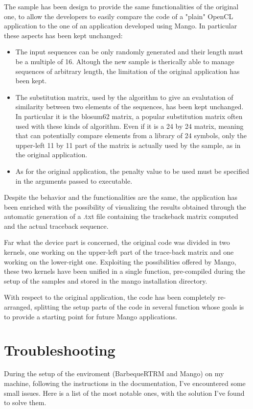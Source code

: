 The sample has been design to provide the same functionalities of the original one, to allow the developers to easily compare the code of a "plain" OpenCL application to the one of an application developed using Mango. In particular these aspects has been kept unchanged:
\begin{itemize}
      \item The input sequences can be only randomly generated and their length must be a multiple of 16. Altough the new sample is therically able to manage sequences of arbitrary length, the limitation of the original application has been kept.
      \item The substitution matrix, used by the algorithm to give an evalutation of similarity between two elements of the sequences, has been kept unchanged. In particular it is the blosum62 matrix, a popular substitution matrix often used with these kinds of algorithm. Even if it is a 24 by 24 matrix, meaning that can potentially compare elements from a library of 24 symbols, only the upper-left 11 by 11 part of the matrix is actually used by the sample, as in the original application.
      \item As for the original application, the penalty value to be used must be specified in the arguments passed to executable.
\end{itemize}
Despite the behavior and the functionalities are the same, the application has been enriched with the possibility of visualizing the results obtained through the automatic generation of a .txt file containing the trackeback matrix computed and the actual traceback sequence.

Far what the device part is concerned, the original code was divided in two kernels, one working on the upper-left part of the trace-back matrix and one working on the lower-right one. Exploiting the possibilities offered by Mango, these two kernels have been unified in a single function, pre-compiled during the setup of the samples and stored in the mango installation directory.

With respect to the original application, the code has been completely re-arranged, splitting the setup parts of the code in several function whose goals is to provide a starting point for future Mango applications.


\section{Troubleshooting}
During the setup of the enviroment (BarbequeRTRM and Mango) on my machine, following the instructions in the documentation, I've encountered some small issues. Here is a list of the most notable ones, with the solution I've found to solve them.

